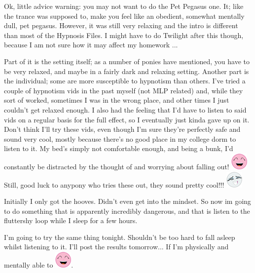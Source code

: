 \documentclass[ebook,12pt,oneside,openany]{memoir}
\begin{document}
\begin{tcolorbox}[title=Sketchi Inktip Quillwing]
\par{Ok, little advice warning: you may not want to do the Pet Pegasus one. It; like the trance was supposed to, make you feel like an obedient, somewhat mentally dull, pet pegasus. However, it was still very relaxing and the intro is different than most of the Hypnosis Files. I might have to do Twilight after this though, because I am not sure how it may affect my homework ...}
\end{tcolorbox}
\begin{tcolorbox}[title=Batbrony]
\par{Part of it is the setting itself; as a number of ponies have mentioned, you have to be very relaxed, and maybe in a fairly dark and relaxing setting.  Another part is the individual; some are more susceptible to hypnotism than others.  I've tried a couple of hypnotism vids in the past myself (not MLP related) and, while they sort of worked, sometimes I was in the wrong place, and other times I just couldn't get relaxed enough.  I also had the feeling that I'd have to listen to said vids on a regular basis for the full effect, so I eventually just kinda gave up on it.  Don't think I'll try these vids, even though I'm sure they're perfectly safe and sound very cool, mostly because there's no good place in my college dorm to listen to it.  My bed's simply not comfortable enough, and being a bunk, I'd constantly be distracted by the thought of and worrying about falling out!  \includegraphics{images/mlp_laugh.png}   Still, good luck to anypony who tries these out, they sound pretty cool!!!  \includegraphics{images/mlp_8pfRZzv.png}}
\end{tcolorbox}
\begin{tcolorbox}[title=Sam]
\begin{tcolorbox}[title=Creeping Dusk]
\par{Initially I only got the hooves. Didn't even get into the mindset. So now im going to do something that is apparently incredibly dangerous, and that is listen to the fluttershy loop while I sleep for a few hours. }
\end{tcolorbox}
\par{I'm going to try the same thing tonight. Shouldn't be too hard to fall asleep whilst listening to it. I'll post the results tomorrow... If I'm physically and mentally able to \includegraphics{images/mlp_laugh.png}.}
\end{tcolorbox}
\end{document}
